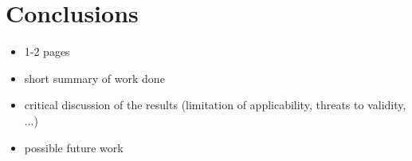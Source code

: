 \section{Conclusions}
\color{black}

\begin{itemize} 
    \item 1-2 pages
    \item short summary of work done
    \item critical discussion of the results (limitation of applicability, threats to validity, ...)
    \item possible future work 
\end{itemize}